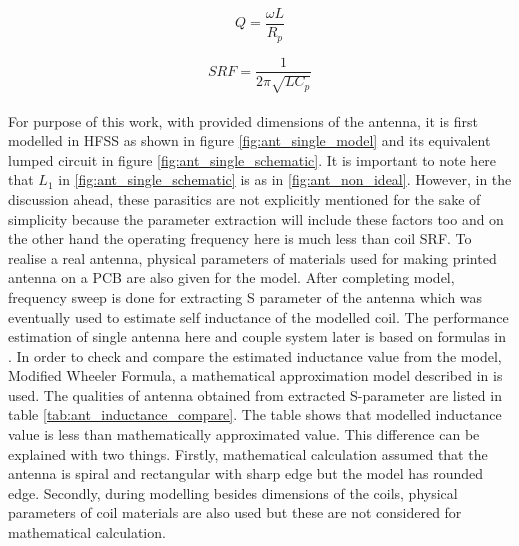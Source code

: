 \documentclass[UKenglish]{ifimaster}  %
\begin{document}
\begin{equation} \label{eq:quality_f} %
Q = \frac {\omega L}{R_{p}}
\end{equation}

\begin{equation} \label{eq:srf}	%
SRF = \frac{1} {2\pi\sqrt{LC_{p}}}
\end{equation}\\

For purpose of this work, with provided dimensions of the antenna, it is first modelled in HFSS as shown in 
figure \ref{fig:ant_single_model} and its equivalent lumped circuit in figure \ref{fig:ant_single_schematic}. 
It is important to note here that $L_{1}$ in \ref{fig:ant_single_schematic} is as in \ref{fig:ant_non_ideal}. However, in the discussion ahead, these 
parasitics are not explicitly mentioned for the sake of simplicity because the parameter extraction will include these factors too and on the other hand the operating frequency here is much less than coil SRF. To realise a real antenna, physical parameters of materials used for making 
printed antenna on a PCB are also given for the model.  After completing model, frequency sweep is done for extracting S parameter of the 
antenna which was eventually used to estimate  self inductance of the modelled coil. The performance estimation of 
single antenna here and couple system later is based on formulas in \cite{ant_SZ_formula}. In order to check and compare the estimated inductance value from 
the model, Modified Wheeler Formula, a mathematical approximation model described in \cite{ant_inductance_calculation} is used. The 
qualities of antenna obtained from extracted S-parameter are listed in table \ref{tab:ant_inductance_compare}. The table shows that 
modelled inductance value is less than mathematically approximated value. This difference can be explained with two things. 
Firstly, mathematical calculation assumed that the antenna is spiral and rectangular with sharp edge but the model has 
rounded edge. Secondly, during modelling besides dimensions of the coils, physical parameters of coil materials are also used 
but these are not considered for mathematical calculation.\\
\end{document}
